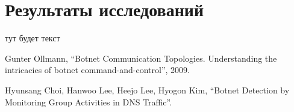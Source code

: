 \documentclass[14pt]{extreport}
\begin{document}
	\chapter{Результаты исследований}
	тут будет текст %
	
\begin{thebibliography}{99}

 Gunter Ollmann, ``Botnet Communication Topologies. Understanding the intricacies of botnet command-and-control'', 2009.

 Hyunsang Choi, Hanwoo Lee, Heejo Lee, Hyogon Kim, ``Botnet Detection by Monitoring Group Activities in
DNS Traffic''.

\end{thebibliography}

%
%
\end{document}
